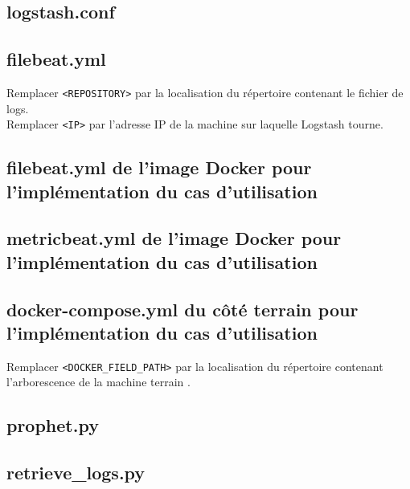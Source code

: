 \documentclass[paper=a4, fontsize=11pt]{scrartcl}
\begin{document}
\subsection{logstash.conf}
\label{appendix:logstashConf}


\subsection{filebeat.yml}
\label{appendix:filebeatConf}

Remplacer \verb,<REPOSITORY>, par la localisation du répertoire contenant le fichier de logs.\\
Remplacer \verb,<IP>, par l'adresse IP de la machine sur laquelle Logstash tourne.

\subsection{filebeat.yml de l'image Docker pour l'implémentation du cas d'utilisation}
\label{appendix:filebeatConfDockerUC}


\subsection{metricbeat.yml de l'image Docker pour l'implémentation du cas d'utilisation}
\label{appendix:metricbeatConfDockerUC}


\subsection{docker-compose.yml du côté terrain pour l'implémentation du cas d'utilisation}
\label{appendix:dockercomposeFieldUC}

Remplacer \verb,<DOCKER_FIELD_PATH>, par la localisation du répertoire contenant l'arborescence de la machine \og terrain \fg.\\

\subsection{prophet.py}
\label{appendix:prophetPy}


\subsection{retrieve\_logs.py}
\label{appendix:retrieveLogsPy}

\end{document}
